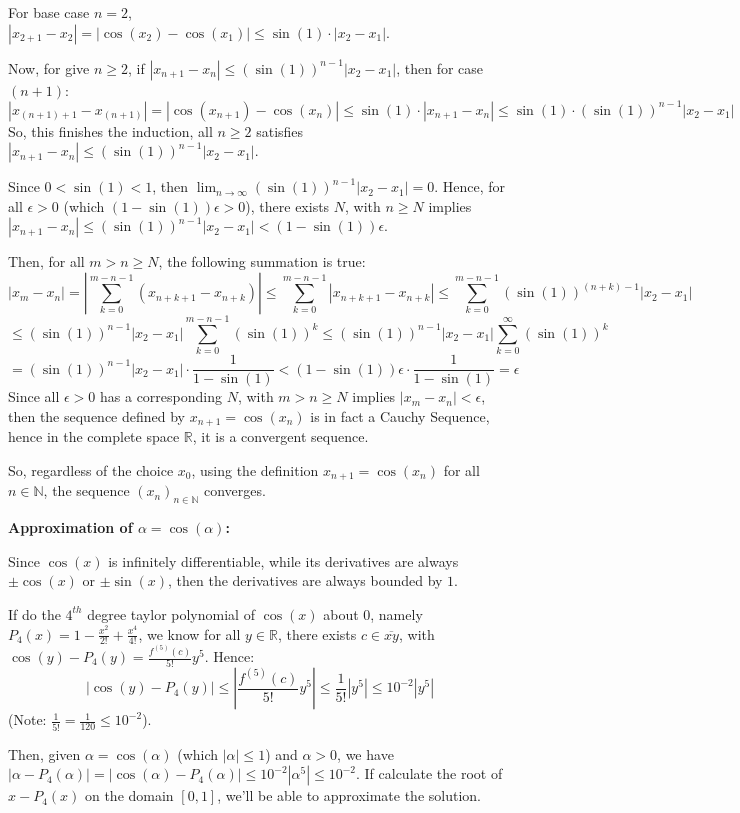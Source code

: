 \documentclass{article}
\begin{document}
For base case $n=2$, $|x_{2+1}-x_2| = |\cos(x_2)-\cos(x_1)| \leq \sin(1)\cdot |x_2-x_1|$.

Now, for give $n\geq 2$, if $|x_{n+1}-x_n|\leq (\sin(1))^{n-1}|x_2-x_1|$, then for case $(n+1)$:
$$|x_{(n+1)+1}-x_{(n+1)}|=|\cos(x_{n+1})-\cos(x_n)|\leq \sin(1)\cdot|x_{n+1}-x_n|\leq \sin(1)\cdot (\sin(1))^{n-1}|x_2-x_1|$$
So, this finishes the induction, all $n\geq 2$ satisfies $|x_{n+1}-x_n|\leq (\sin(1))^{n-1}|x_2-x_1|$.

Since $0<\sin(1)<1$, then $\lim_{n\rightarrow\infty}(\sin(1))^{n-1}|x_2-x_1|=0$. Hence, for all $\epsilon>0$ (which $(1-\sin(1))\epsilon>0$), there exists $N$, with $n\geq N$ implies $|x_{n+1}-x_n|\leq (\sin(1))^{n-1}|x_2-x_1|<(1-\sin(1))\epsilon$.

Then, for all $m>n\geq N$, the following summation is true:
$$|x_m-x_n| = \left|\sum_{k=0}^{m-n-1}(x_{n+k+1}-x_{n+k})\right|\leq\sum_{k=0}^{m-n-1}|x_{n+k+1}-x_{n+k}| \leq \sum_{k=0}^{m-n-1}(\sin(1))^{(n+k)-1}|x_2-x_1|$$
$$\leq (\sin(1))^{n-1}|x_2-x_1|\sum_{k=0}^{m-n-1}(\sin(1))^k\leq (\sin(1))^{n-1}|x_2-x_1|\sum_{k=0}^{\infty}(\sin(1))^k $$
$$= (\sin(1))^{n-1}|x_2-x_1|\cdot\frac{1}{1-\sin(1)} < (1-\sin(1))\epsilon\cdot\frac{1}{1-\sin(1)}=\epsilon$$
Since all $\epsilon>0$ has a corresponding $N$, with $m>n\geq N$ implies $|x_m-x_n|<\epsilon$, then the sequence defined by $x_{n+1}=\cos(x_n)$ is in fact a Cauchy Sequence,
hence in the complete space $\mathbb{R}$, it is a convergent sequence.

So, regardless of the choice $x_0$, using the definition $x_{n+1}=\cos(x_n)$ for all $n\in\mathbb{N}$, the sequence $(x_n)_{n\in\mathbb{N}}$ converges.


\hfil

\textbf{Approximation of $\alpha=\cos(\alpha)$:}

Since $\cos(x)$ is infinitely differentiable, while its derivatives are always $\pm\cos(x)$ or $\pm\sin(x)$, then the derivatives are always bounded by $1$.

If do the $4^{th}$ degree taylor polynomial of $\cos(x)$ about $0$, namely $P_4(x)=1-\frac{x^2}{2!}+\frac{x^4}{4!}$, we know for all $y\in\mathbb{R}$,
there exists $c\in \overline{xy}$, with $\cos(y)-P_4(y)=\frac{f^{(5)}(c)}{5!}y^5$. Hence:
$$|\cos(y)-P_4(y)| \leq \left|\frac{f^{(5)}(c)}{5!}y^5\right| \leq \frac{1}{5!}|y^5| \leq 10^{-2}|y^5|$$
(Note: $\frac{1}{5!}=\frac{1}{120}\leq 10^{-2}$).

Then, given $\alpha=\cos(\alpha)$ (which $|\alpha|\leq 1$) and $\alpha>0$, we have $|\alpha-P_4(\alpha)| = |\cos(\alpha)-P_4(\alpha)| \leq 10^{-2}|\alpha^5| \leq 10^{-2}$.
If calculate the root of $x-P_4(x)$ on the domain $[0,1]$, we'll be able to approximate the solution.
\end{document}
